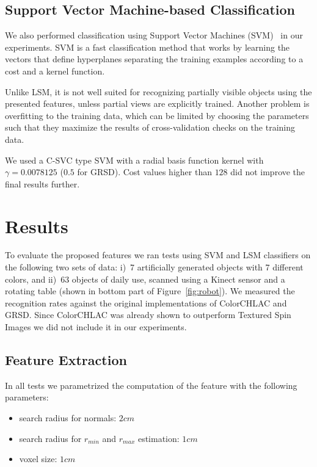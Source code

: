 \documentclass[conference]{sty/IEEEtran}
\begin{document}
\subsection{Support Vector Machine-based Classification}
We also performed classification using Support Vector Machines (SVM)~\cite{svm99} in our experiments.
SVM is a fast classification method that works by learning the vectors that define hyperplanes separating
the training examples according to a cost and a kernel function.

Unlike LSM, it is not well suited for recognizing partially visible objects using the presented features,
unless partial views are explicitly trained. Another problem is overfitting to the training data, which
can be limited by choosing the parameters such that they maximize the results of cross-validation checks
on the training data.

We used a C-SVC type SVM with a radial basis function kernel \cite{LIBSVM} with $\gamma = 0.0078125$
($0.5$ for GRSD). Cost values higher than $128$ did not improve the final results further.


\section{Results}
\label{sec:results}
To evaluate the proposed features we ran
tests using SVM and LSM classifiers on the following two sets of data: 
i)~7 artificially generated objects with 7 different colors, and
ii)~63 objects of daily use, scanned using a Kinect sensor and a rotating table
(shown in bottom part of Figure~\ref{fig:robot}). 
We measured the recognition rates against the original implementations of ColorCHLAC and 
GRSD. Since ColorCHLAC was already shown to outperform Textured Spin Images
we did not include it in our experiments.

\subsection{Feature Extraction}
\label{sec:feature_extraction}
In all tests we parametrized the computation of the feature with the following parameters:
\begin{itemize}
\item search radius for normals: $2cm$
\item search radius for $r_{min}$ and $r_{max}$ estimation: $1cm$
\item voxel size: $1cm$
\end{itemize}
\end{document}
